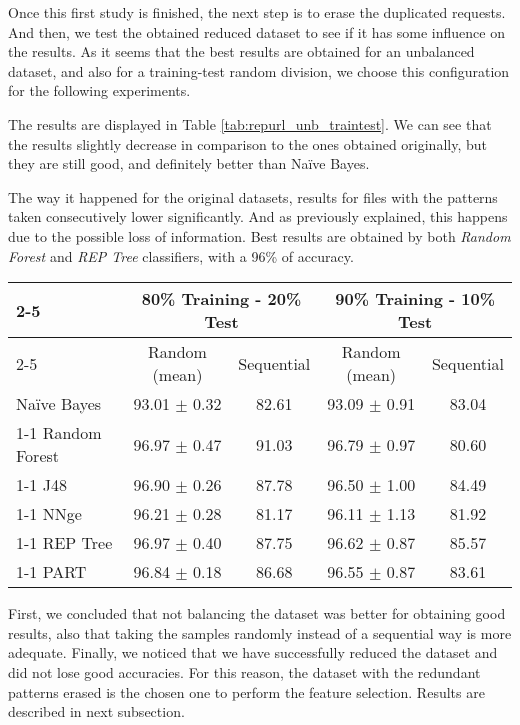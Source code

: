 \documentclass{llncs}
\begin{document}
Once this first study is finished, the next step is to erase the duplicated requests. And then, we test the obtained reduced dataset to see if it has some influence on the results. As it seems that the best results are obtained for an unbalanced dataset, and also for a training-test random division, we choose this configuration for the following experiments.

The results are displayed in Table \ref{tab:repurl_unb_traintest}. We can see that the results slightly decrease in comparison to the ones obtained originally, but they are still good, and definitely better than Na\"ive Bayes.

The way it happened for the original datasets, results for files with the patterns taken consecutively lower significantly. And as previously explained, this happens due to the possible loss of information. Best results are obtained by both \textit{Random Forest} and \textit{REP Tree} classifiers, with a 96\% of accuracy.

\begin{table*}[htpb]
\centering
 \caption{\label{tab:repurl_unb_traintest}Percentage of correctly classified patterns for unbalanced data, after the removal of entries that could lead to misclassification.}
{\small
\begin{tabular}{|l|c|c|c|c|}
\cline{2-5}
\multicolumn{1}{l|}{} & \multicolumn{2}{c|}{80\% Training - 20\% Test} & \multicolumn{2}{c|}{90\% Training - 10\% Test} \\
\cline{2-5}
\multicolumn{1}{l|}{} & Random (mean) & Sequential & Random (mean) & Sequential \\
\hline
Na\"ive Bayes & 93.01 $\pm$ 0.32 & 82.61 & 93.09 $\pm$ 0.91 & 83.04 \\
\cline{1-1}
Random Forest & 96.97 $\pm$ 0.47 & 91.03 & 96.79 $\pm$ 0.97 & 80.60 \\
\cline{1-1}
J48 & 96.90 $\pm$ 0.26 & 87.78 & 96.50 $\pm$ 1.00 & 84.49 \\
\cline{1-1}
NNge & 96.21 $\pm$ 0.28 & 81.17 & 96.11 $\pm$ 1.13 & 81.92 \\
\cline{1-1}
REP Tree & 96.97 $\pm$ 0.40 & 87.75 & 96.62 $\pm$ 0.87 & 85.57 \\
\cline{1-1}
PART & 96.84 $\pm$ 0.18 & 86.68 & 96.55 $\pm$ 0.87 & 83.61 \\
\hline
\end{tabular}
}
\end{table*}

First, we concluded that not balancing the dataset was better for obtaining good results, also that taking the samples randomly instead of a sequential way is more adequate. Finally, we noticed that we have successfully reduced the dataset and did not lose good accuracies. For this reason, the dataset with the redundant patterns erased is the chosen one to perform the feature selection. Results are described in next subsection.
\end{document}
